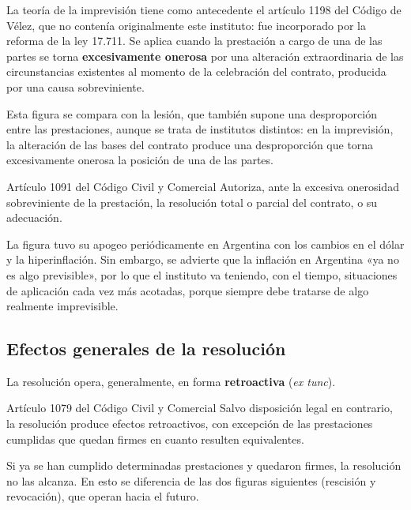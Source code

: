 \documentclass[12pt,oneside]{book}
\begin{document}
La teoría de la imprevisión tiene como antecedente el artículo 1198 del Código de Vélez, que no contenía originalmente este instituto: fue incorporado por la reforma de la ley 17.711. Se aplica cuando la prestación a cargo de una de las partes se torna \textbf{excesivamente onerosa} por una alteración extraordinaria de las circunstancias existentes al momento de la celebración del contrato, producida por una causa sobreviniente.

Esta figura se compara con la lesión, que también supone una desproporción entre las prestaciones, aunque se trata de institutos distintos: en la imprevisión, la alteración de las bases del contrato produce una desproporción que torna excesivamente onerosa la posición de una de las partes.

\begin{articulo}{Artículo 1091 del Código Civil y Comercial}
Autoriza, ante la excesiva onerosidad sobreviniente de la prestación, la resolución total o parcial del contrato, o su adecuación.
\end{articulo}

\begin{note}
La figura tuvo su apogeo periódicamente en Argentina con los cambios en el dólar y la hiperinflación. Sin embargo, se advierte que la inflación en Argentina «ya no es algo previsible», por lo que el instituto va teniendo, con el tiempo, situaciones de aplicación cada vez más acotadas, porque siempre debe tratarse de algo realmente imprevisible.
\end{note}

\subsection{Efectos generales de la resolución}

La resolución opera, generalmente, en forma \textbf{retroactiva} (\textit{ex tunc}).

\begin{articulo}{Artículo 1079 del Código Civil y Comercial}
Salvo disposición legal en contrario, la resolución produce efectos retroactivos, con excepción de las prestaciones cumplidas que quedan firmes en cuanto resulten equivalentes.
\end{articulo}

Si ya se han cumplido determinadas prestaciones y quedaron firmes, la resolución no las alcanza. En esto se diferencia de las dos figuras siguientes (rescisión y revocación), que operan hacia el futuro.
\end{document}
